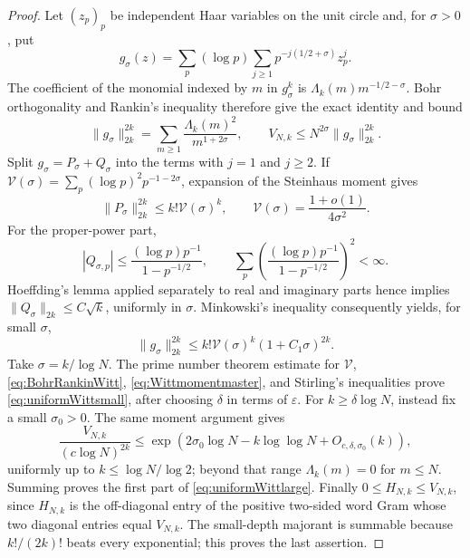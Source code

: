 \documentclass[11pt]{amsart}
\theoremstyle{definition}
\theoremstyle{remark}
\begin{document}
\begin{proof}
Let \((z_p)_p\) be independent Haar variables on the unit circle and, for
\(\sigma>0\), put
\[
 g_\sigma(z)=\sum_p(\log p)\sum_{j\ge1}
 p^{-j(1/2+\sigma)}z_p^j.
\]
The coefficient of the monomial indexed by \(m\) in \(g_\sigma^k\) is
\(\Lambda_k(m)m^{-1/2-\sigma}\).  Bohr orthogonality and Rankin's
inequality therefore give the exact identity and bound
\begin{equation}\label{eq:BohrRankinWitt}
 \|g_\sigma\|_{2k}^{2k}
 =\sum_{m\ge1}\frac{\Lambda_k(m)^2}{m^{1+2\sigma}},
 \qquad
 V_{N,k}\le N^{2\sigma}\|g_\sigma\|_{2k}^{2k}.
\end{equation}
Split \(g_\sigma=P_\sigma+Q_\sigma\) into the terms with \(j=1\) and
\(j\ge2\).  If
\(\mathcal V(\sigma)=\sum_p(\log p)^2p^{-1-2\sigma}\), expansion of the
Steinhaus moment gives
\[
 \|P_\sigma\|_{2k}^{2k}\le k!\mathcal V(\sigma)^k,
 \qquad
 \mathcal V(\sigma)=\frac{1+o(1)}{4\sigma^2}.
\]
For the proper-power part,
\[
 |Q_{\sigma,p}|\le \frac{(\log p)p^{-1}}{1-p^{-1/2}},
 \qquad
 \sum_p\left(\frac{(\log p)p^{-1}}{1-p^{-1/2}}\right)^2<\infty.
\]
Hoeffding's lemma applied separately to real and imaginary parts hence
implies \(\|Q_\sigma\|_{2k}\le C\sqrt k\), uniformly in \(\sigma\).
Minkowski's inequality consequently yields, for small \(\sigma\),
\begin{equation}\label{eq:Wittmomentmaster}
 \|g_\sigma\|_{2k}^{2k}
 \le k!\mathcal V(\sigma)^k(1+C_1\sigma)^{2k}.
\end{equation}
Take \(\sigma=k/\log N\).  The prime number theorem estimate for
\(\mathcal V\), \eqref{eq:BohrRankinWitt},
\eqref{eq:Wittmomentmaster}, and Stirling's inequalities prove
\eqref{eq:uniformWittsmall}, after choosing \(\delta\) in terms of
\(\varepsilon\).  For \(k\ge\delta\log N\), instead fix a small
\(\sigma_0>0\).  The same moment argument gives
\[
 \frac{V_{N,k}}{(c\log N)^{2k}}
 \le \exp\!\left(2\sigma_0\log N-
                 k\log\log N+O_{c,\delta,\sigma_0}(k)\right),
\]
uniformly up to \(k\le\log N/\log2\); beyond that range
\(\Lambda_k(m)=0\) for \(m\le N\).  Summing proves the first part of
\eqref{eq:uniformWittlarge}.  Finally \(0\le H_{N,k}\le V_{N,k}\), since
\(H_{N,k}\) is the off-diagonal entry of the positive two-sided word Gram
whose two diagonal entries equal \(V_{N,k}\).  The small-depth majorant is
summable because \(k!/(2k)!\) beats every exponential; this proves the
last assertion.
\end{proof}
\end{document}
